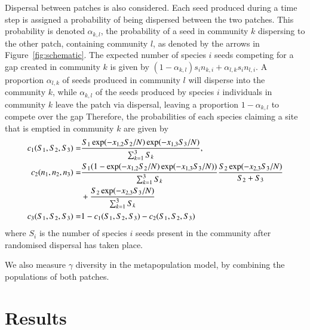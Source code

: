 Dispersal between patches is also considered. Each seed produced during a time step is assigned a probability of being dispersed between the two patches. This probability is denoted $\alpha_{k,l}$, the probability of a seed in community $k$ dispersing to the other patch, containing community $l$, as denoted by the arrows in Figure~\ref{fig:schematic}. The expected number of species $i$ seeds competing for a gap created in community $k$ is given by $(1-\alpha_{k,l})s_in_{k,i} + \alpha_{l,k}s_in_{l,i}$. A proportion $\alpha_{l,k}$ of seeds produced in community $l$ will disperse into the community $k$, while $\alpha_{k,l}$ of the seeds produced by species $i$ individuals in community $k$ leave the patch via dispersal, leaving a proportion $1-\alpha_{k,l}$ to compete over the gap Therefore, the probabilities of each species claiming a site that is emptied in community $k$ are given by
\begin{align}
\label{c1patched}
c_1(S_1,S_2,S_3)=&\frac{S_1 \exp(-x_{1,2}S_2/N)\exp(-x_{1,3}S_3/N)}{\sum_{k=1}^3 S_k},\\
c_2(n_1,n_2,n_3)=&\frac{S_1(1-\exp(-x_{1,2}S_2/N)\exp(-x_{1,3}S_3/N))}{\sum_{k=1}^3 S_k}\frac{S_2\exp(-x_{2,3}S_3/N)}{S_2+S_3} \notag \\
&+\frac{S_2\exp(-x_{2,3}S_3/N)}{\sum_{k=1}^3 S_k} \\
c_3(S_1,S_2,S_3)=&1-c_1(S_1,S_2,S_3)-c_2(S_1,S_2,S_3)
\end{align}
where $S_i$ is the number of species $i$ seeds present in the community after randomised dispersal has taken place.

We also measure $\gamma$ diversity in the metapopulation model, by combining the populations of both patches.

\section{Results}
